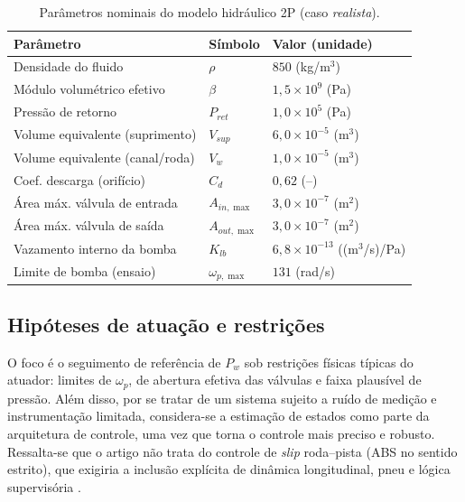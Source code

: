 \documentclass[a4paper]{ifacconf}
\begin{document}
\begin{table}
   \caption{Par\^ametros nominais do modelo hidr\'aulico 2P (caso \textit{realista}).}
   \label{tab:parametros_hidraulico_realista}
   \begin{center}
      \begin{tabular}{l l l}
         \hline
         Par\^ametro                        & S\'imbolo         & Valor (unidade)                       \\
         \hline
         Densidade do fluido                & $\rho$            & $850$ (kg/m$^3$)                      \\
         M\'odulo volum\'etrico efetivo     & $\beta$           & $1{,}5\times 10^9$ (Pa)               \\
         Press\~ao de retorno               & $P_{ret}$         & $1{,}0\times 10^5$ (Pa)               \\
         Volume equivalente (suprimento)    & $V_{sup}$         & $6{,}0\times 10^{-5}$ (m$^3$)         \\
         Volume equivalente (canal/roda)    & $V_{w}$           & $1{,}0\times 10^{-5}$ (m$^3$)         \\
         Coef. descarga (orif\'icio)        & $C_d$             & $0{,}62$ (--)                         \\
         \'Area m\'ax. v\'alvula de entrada & $A_{in,\max}$     & $3{,}0\times 10^{-7}$ (m$^2$)         \\
         \'Area m\'ax. v\'alvula de sa\'ida & $A_{out,\max}$    & $3{,}0\times 10^{-7}$ (m$^2$)         \\
         Vazamento interno da bomba         & $K_{lb}$          & $6{,}8\times 10^{-13}$ ((m$^3$/s)/Pa) \\
         Limite de bomba (ensaio)           & $\omega_{p,\max}$ & $131$ (rad/s)                         \\
         \hline
      \end{tabular}
   \end{center}
\end{table}

\subsection{Hipóteses de atuação e restrições}
O foco é o seguimento de referência de $P_w$ sob restrições físicas típicas do atuador: limites de $\omega_p$, de abertura efetiva das válvulas e faixa plausível de pressão. Além disso, por se tratar de um sistema sujeito a ruído de medição e instrumentação limitada, considera-se a estimação de estados como parte da arquitetura de controle, uma vez que torna o controle mais preciso e robusto. Ressalta-se que o artigo não trata do controle de \textit{slip} roda--pista (ABS no sentido estrito), que exigiria a inclusão explícita de dinâmica longitudinal, pneu e lógica supervisória \cite{Konrad2014}.
\end{document}
